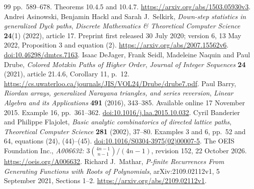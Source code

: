 \documentclass[11pt]{article}
\begin{document}
\begin{thebibliography}{99}
pp.\ 589--678. Theorems 10.4.5 and 10.4.7.
\url{https://arxiv.org/abs/1503.05930v3}.
 Andrei Asinowski, Benjamin Hackl and Sarah J.\ Selkirk,
\emph{Down-step statistics in generalized Dyck paths},
\emph{Discrete Mathematics \& Theoretical Computer Science}
\textbf{24}(1) (2022), article 17. Preprint first released 30 July 2020;
version 6, 13 May 2022, Proposition 3 and equation (2).
\url{https://arxiv.org/abs/2007.15562v6}.
\href{https://doi.org/10.46298/dmtcs.7163}{doi:10.46298/dmtcs.7163}.
 Isaac DeJager, Frank Seidl, Madeleine Naquin and Paul Drube,
\emph{Colored Motzkin Paths of Higher Order},
\emph{Journal of Integer Sequences} \textbf{24} (2021), article 21.4.6,
Corollary 11, p.\ 12.
\url{https://cs.uwaterloo.ca/journals/JIS/VOL24/Drube/drube7.pdf}.
 Paul Barry,
\emph{Riordan arrays, generalized Narayana triangles, and series reversion},
\emph{Linear Algebra and its Applications} \textbf{491} (2016), 343--385.
Available online 17 November 2015. Example 16, pp.\ 361--362.
\href{https://doi.org/10.1016/j.laa.2015.10.032}{doi:10.1016/j.laa.2015.10.032}.
 Cyril Banderier and Philippe Flajolet,
\emph{Basic analytic combinatorics of directed lattice paths},
\emph{Theoretical Computer Science} \textbf{281} (2002), 37--80.
Examples 3 and 6, pp.\ 52 and 64, equations (24), (44)--(45).
\href{https://doi.org/10.1016/S0304-3975(02)00007-5}{doi:10.1016/S0304-3975(02)00007-5}.
 The OEIS Foundation Inc.,
\emph{A006632: $3\binom{4n-1}{n-1}/(4n-1)$},
revision 152, 22 October 2026.
\url{https://oeis.org/A006632}.
 Richard J.\ Mathar,
\emph{P-finite Recurrences From Generating Functions with Roots of Polynomials},
arXiv:2109.02112v1, 5 September 2021, Sections 1--2.
\url{https://arxiv.org/abs/2109.02112v1}.
\end{thebibliography}
\end{document}
